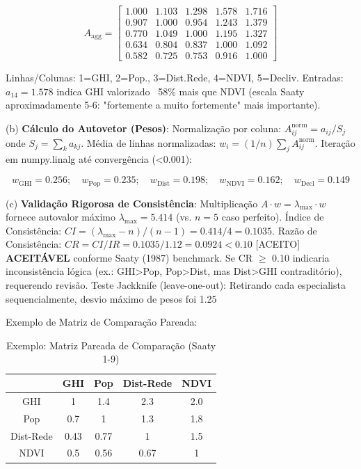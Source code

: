\documentclass[12pt, a4paper]{article}
\begin{document}
\begin{equation}
A_{\text{agg}} = \begin{bmatrix}
1.000 & 1.103 & 1.298 & 1.578 & 1.716 \\
0.907 & 1.000 & 0.954 & 1.243 & 1.379 \\
0.770 & 1.049 & 1.000 & 1.195 & 1.327 \\
0.634 & 0.804 & 0.837 & 1.000 & 1.092 \\
0.582 & 0.725 & 0.753 & 0.916 & 1.000
\end{bmatrix}
\end{equation}

Linhas/Colunas: 1=GHI, 2=Pop., 3=Dist.Rede, 4=NDVI, 5=Decliv. Entradas: $a_{14}=1.578$ indica GHI valorizado ~58\% mais que NDVI (escala Saaty aproximadamente 5-6: "fortemente a muito fortemente" mais importante).

(b) \textbf{Cálculo do Autovetor (Pesos)}: Normalização por coluna: $A^{\text{norm}}_{ij} = a_{ij}/S_j$ onde $S_j = \sum_k a_{kj}$. Média de linhas normalizadas: $w_i = (1/n) \sum_j A^{\text{norm}}_{ij}$. Iteração em numpy.linalg até convergência (<0.001):

\begin{equation}
w_{\text{GHI}} = 0.256; \quad w_{\text{Pop}} = 0.235; \quad w_{\text{Dist}} = 0.198; \quad w_{\text{NDVI}} = 0.162; \quad w_{\text{Decl}} = 0.149
\end{equation}

(c) \textbf{Validação Rigorosa de Consistência}: Multiplicação $A \cdot w = \lambda_{\max} \cdot w$ fornece autovalor máximo $\lambda_{\max} = 5.414$ (vs. $n=5$ caso perfeito). Índice de Consistência: $CI = (\lambda_{\max} - n)/(n-1) = 0.414/4 = 0.1035$. Razão de Consistência: $CR = CI/IR = 0.1035/1.12 = 0.0924 < 0.10$ [ACEITO] \textbf{ACEITÁVEL} conforme Saaty (1987) benchmark. Se CR $\geq$ 0.10 indicaria inconsistência lógica (ex.: GHI>Pop, Pop>Dist, mas Dist>GHI contraditório), requerendo revisão. Teste Jackknife (leave-one-out): Retirando cada especialista sequencialmente, desvio máximo de pesos foi 1.25%

Exemplo de Matriz de Comparação Pareada:

\begin{table}[H]
\centering
\caption{Exemplo: Matriz Pareada de Comparação (Saaty 1-9)}
\footnotesize
\begin{tabular}{|c|c|c|c|c|}
\hline
 & GHI & Pop & Dist-Rede & NDVI \\
\hline
GHI & 1 & 1.4 & 2.3 & 2.0 \\
\hline
Pop & 0.7 & 1 & 1.3 & 1.8 \\
\hline
Dist-Rede & 0.43 & 0.77 & 1 & 1.5 \\
\hline
NDVI & 0.5 & 0.56 & 0.67 & 1 \\
\hline
\end{tabular}
\end{table}
\end{document}
